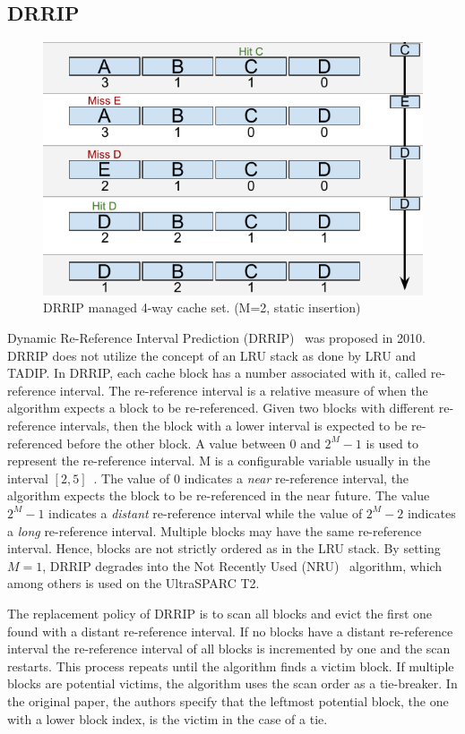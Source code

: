 \subsection{DRRIP}
\label{sec:algorithms:drrip}

\begin{figure}[ht]
    \centering
    \includegraphics[width=.65\textwidth]{figures/algorithms/DRRIP}
    \caption[DRRIP managed 4-way cache set.]{DRRIP managed 4-way cache set. (M=2, static insertion)}
    \label{fig:algorithms:drrip_example}
\end{figure}

Dynamic Re-Reference Interval Prediction (DRRIP)~\cite{Jaleel2010} was proposed in 2010.
DRRIP does not utilize the concept of an LRU stack as done by LRU and TADIP.
In DRRIP, each cache block has a number associated with it, called re-reference interval.
The re-reference interval is a relative measure of when the algorithm expects a block to be re-referenced.
Given two blocks with different re-reference intervals, then the block with a lower interval is expected to be re-referenced before the other block.
A value between 0 and $2^M - 1$ is used to represent the re-reference interval.
M is a configurable variable usually in the interval $[2, 5]$~\cite{Jaleel2010}.
The value of 0 indicates a \textit{near} re-reference interval, the algorithm expects the block to be re-referenced in the near future.
The value $2^M - 1$ indicates a \textit{distant} re-reference interval while the value of $2^M - 2$ indicates a \textit{long} re-reference interval.
Multiple blocks may have the same re-reference interval. 
Hence, blocks are not strictly ordered as in the LRU stack.
By setting $M=1$, DRRIP degrades into the Not Recently Used (NRU)~\cite{Microsystems2007} algorithm, which among others is used on the UltraSPARC T2.

The replacement policy of DRRIP is to scan all blocks and evict the first one found with a distant re-reference interval.
If no blocks have a distant re-reference interval the re-reference interval of all blocks is incremented by one and the scan restarts.
This process repeats until the algorithm finds a victim block.
If multiple blocks are potential victims, the algorithm uses the scan order as a tie-breaker.
In the original paper, the authors specify that the leftmost potential block, the one with a lower block index, is the victim in the case of a tie.

